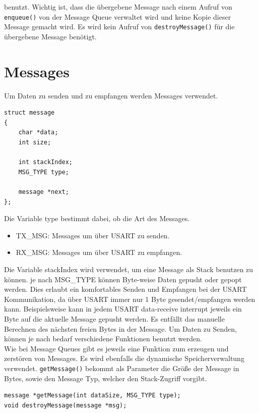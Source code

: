 \documentclass[fontsize=12pt, toc=bibliography, notitlepage]{scrreprt}
\begin{document}
benutzt. Wichtig ist, dass die übergebene Message nach einem Aufruf von \lstinline$enqueue()$ von der Message Queue verwaltet wird und keine Kopie dieser Message gemacht wird. Es wird kein Aufruf von \lstinline$destroyMessage()$ für die übergebene Message benötigt.

\section{Messages}
\label{subsec:shell-messages}
Um Daten zu senden und zu empfangen werden Messages verwendet.\\

\begin{lstlisting}
struct message
{
	char *data;
	int size;

	int stackIndex;
	MSG_TYPE type;

	message *next;
};
\end{lstlisting}

Die Variable type bestimmt dabei, ob die Art des Messages.
\begin{itemize}
	\item TX\_MSG: Messages um über USART zu senden.
	\item RX\_MSG: Messages um über USART zu empfangen.
\end{itemize}

Die Variable stackIndex wird verwendet, um eine Message als Stack benutzen zu können. je nach MSG\_TYPE können Byte-weise Daten gepusht oder gepopt werden. Dies erlaubt ein komfortables Senden und Empfangen bei der USART Kommunikation, da über USART immer nur 1 Byte gesendet/empfangen werden kann. Beispielsweise kann in jedem USART data-receive interrupt jeweils ein Byte auf die aktuelle Message gepusht werden. Es entfällt das manuelle Berechnen des nächsten freien Bytes in der Message. Um Daten zu Senden, können je nach bedarf verschiedene Funktionen benutzt werden.\\

Wie bei Message Queues gibt es jeweils eine Funktion zum erzeugen und zerstören von Messages. Es wird ebenfalls die dynamische Speicherverwaltung verwendet. \lstinline$getMessage()$ bekommt als Parameter die Größe der Message in Bytes, sowie den Message Typ, welcher den Stack-Zugriff vorgibt.\\

\begin{lstlisting}
message *getMessage(int dataSize, MSG_TYPE type);
void destroyMessage(message *msg);
\end{lstlisting}
\end{document}

